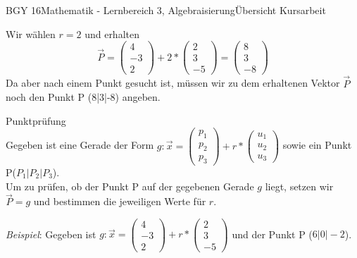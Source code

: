 \documentclass[oneside,openany,headings=optiontotoc,11pt,numbers=noenddot]{scrreprt}
\begin{document}
\begin{worksheet}{BGY 16}{Mathematik - Lernbereich 3, Algebraisierung}{Übersicht Kursarbeit}
\begin{framed}
			Wir wählen \(r = 2\) und erhalten
			\[\vec{P} = \left(\begin{array}{c}4\\-3\\2\end{array}\right) + 2*\left(\begin{array}{c}2\\3\\-5\end{array}\right) = \left(\begin{array}{c}8\\3\\-8\end{array}\right)\]
			Da aber nach einem Punkt gesucht ist, müssen wir zu dem erhaltenen Vektor \(\vec{P}\) noch den Punkt P (8|3|-8) angeben.
		\end{framed}
		\begin{framed}
			\noindent
			\tiny{\color{codegray}Punktprüfung}\normalcolor\normalsize\\
			Gegeben ist eine Gerade der Form \(g: \vec{x} = \left(\begin{array}{c}p_1\\p_2\\p_3\end{array}\right) + r*\left(\begin{array}{c}u_1\\u_2\\u_3\end{array}\right)\) sowie ein Punkt P(\(P_1|P_2|P_3\)).\\
			Um zu prüfen, ob der Punkt P auf der gegebenen Gerade \(g\) liegt, setzen wir \(\vec{P} = g\) und bestimmen die jeweiligen Werte für \(r\).\\
			\par\bigskip\noindent
			\textit{Beispiel}: Gegeben ist \(g: \vec{x} = \left(\begin{array}{c}4\\-3\\2\end{array}\right) + r*\left(\begin{array}{c}2\\3\\-5\end{array}\right)\) und der Punkt P (\(6|0|-2\)).\\
			\begin{tabularx}{\textwidth}{Xl}

\end{tabularx}
\end{framed}
\end{worksheet}
\end{document}
